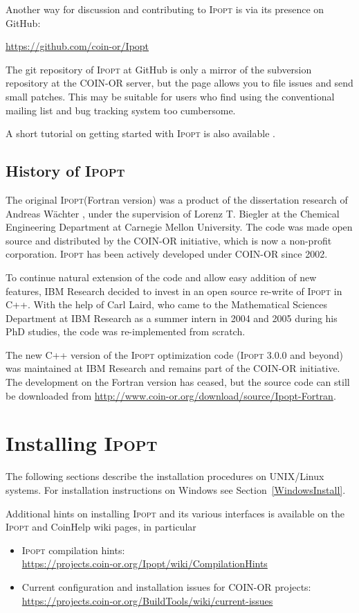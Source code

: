 \documentclass[10pt]{article}
\newcommand{\Ipopt}{\textsc{Ipopt}\xspace}
\begin{document}
Another way for discussion and contributing to \Ipopt is via its presence
on GitHub:
\begin{center}
\url{https://github.com/coin-or/Ipopt}
\end{center}
The git repository of \Ipopt at GitHub is only a mirror of the
subversion repository at the COIN-OR server, but the page allows you to
file issues and send small patches. This may be suitable for users who
find using the conventional mailing list and bug tracking system too
cumbersome.

A short tutorial on getting started with \Ipopt is also available 
\cite{Waechter90Minutes}.

\subsection{History of \Ipopt}
The original \Ipopt (Fortran version) was a product of the
dissertation research of Andreas W\"achter \cite{WaechterPhD}, under
the supervision of Lorenz T. Biegler at the Chemical Engineering
Department at Carnegie Mellon University. The code was made open
source and distributed by the COIN-OR initiative, which is now a
non-profit corporation.  \Ipopt has been actively developed under
COIN-OR since 2002.

To continue natural extension of the code and allow easy addition of
new features, IBM Research decided to invest in an open source
re-write of \Ipopt in C++.  With the help of Carl Laird, who came to
the Mathematical Sciences Department at IBM Research as a summer
intern in 2004 and 2005 during his PhD studies, the code was
re-implemented from scratch.

The new C++ version of the \Ipopt optimization code (\Ipopt 3.0.0
and beyond) was maintained at IBM Research and remains part of the
COIN-OR initiative. The development on the Fortran version has
ceased, but the source code can still be downloaded from \url{http://www.coin-or.org/download/source/Ipopt-Fortran}.

\section{Installing \Ipopt}\label{Installing}

The following sections describe the installation procedures on
UNIX/Linux systems.  For installation instructions on Windows
see Section~\ref{WindowsInstall}.

Additional hints on installing \Ipopt and its various interfaces is available
on the \Ipopt and CoinHelp wiki pages, in particular
\begin{itemize}
\item \Ipopt compilation hints:\\
  \url{https://projects.coin-or.org/Ipopt/wiki/CompilationHints}
\item Current configuration and installation issues for COIN-OR projects:\\
  \url{https://projects.coin-or.org/BuildTools/wiki/current-issues}
\end{itemize}
\end{document}
